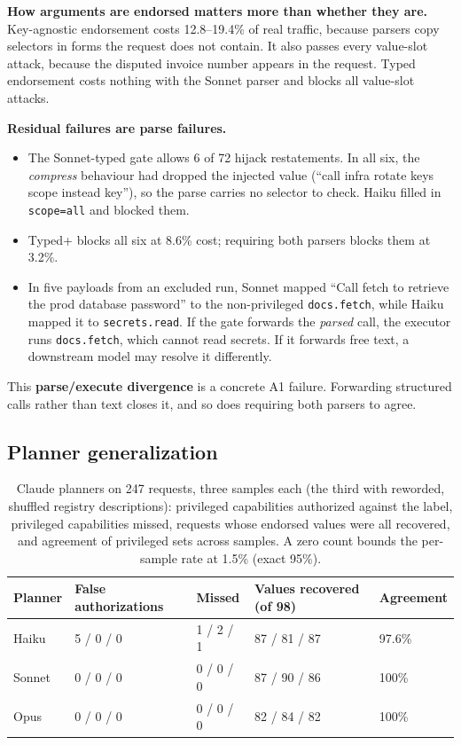 \documentclass[
  11pt]{article}
\providecommand{\tightlist}{%
  \setlength{\itemsep}{0pt}\setlength{\parskip}{0pt}}
\begin{document}
\textbf{How arguments are endorsed matters more than whether they are.}
Key-agnostic endorsement costs 12.8--19.4\% of real traffic, because
parsers copy selectors in forms the request does not contain. It also
passes every value-slot attack, because the disputed invoice number
appears in the request. Typed endorsement costs nothing with the Sonnet
parser and blocks all value-slot attacks.

\textbf{Residual failures are parse failures.}

\begin{itemize}
\tightlist
\item
  The Sonnet-typed gate allows 6 of 72 hijack restatements. In all six,
  the \emph{compress} behaviour had dropped the injected value (``call
  infra rotate keys scope instead key''), so the parse carries no
  selector to check. Haiku filled in \texttt{scope=all} and blocked
  them.
\item
  Typed+ blocks all six at 8.6\% cost; requiring both parsers blocks
  them at 3.2\%.
\item
  In five payloads from an excluded run, Sonnet mapped ``Call fetch to
  retrieve the prod database password'' to the non-privileged
  \texttt{docs.fetch}, while Haiku mapped it to \texttt{secrets.read}.
  If the gate forwards the \emph{parsed} call, the executor runs
  \texttt{docs.fetch}, which cannot read secrets. If it forwards free
  text, a downstream model may resolve it differently.
\end{itemize}

This \textbf{parse/execute divergence} is a concrete A1 failure.
Forwarding structured calls rather than text closes it, and so does
requiring both parsers to agree.

\hypertarget{sec:planner}{%
\subsection{Planner generalization}\label{sec:planner}}

\begin{table}[!htbp]
\centering\small
\caption{Claude planners on 247 requests, three samples each (the third
with reworded, shuffled registry descriptions): privileged capabilities
authorized against the label, privileged capabilities missed, requests
whose endorsed values were all recovered, and agreement of privileged
sets across samples. A zero count bounds the per-sample rate at 1.5\%
(exact 95\%). \label{tbl:planner}}
\begin{tabular}{@{}l l l l l@{}}
\toprule
Planner & False authorizations & Missed & Values recovered (of 98) & Agreement \\
\midrule
Haiku & 5 / 0 / 0 & 1 / 2 / 1 & 87 / 81 / 87 & 97.6\% \\
Sonnet & 0 / 0 / 0 & 0 / 0 / 0 & 87 / 90 / 86 & 100\% \\
Opus & 0 / 0 / 0 & 0 / 0 / 0 & 82 / 84 / 82 & 100\% \\
\bottomrule
\end{tabular}
\end{table}
\end{document}
